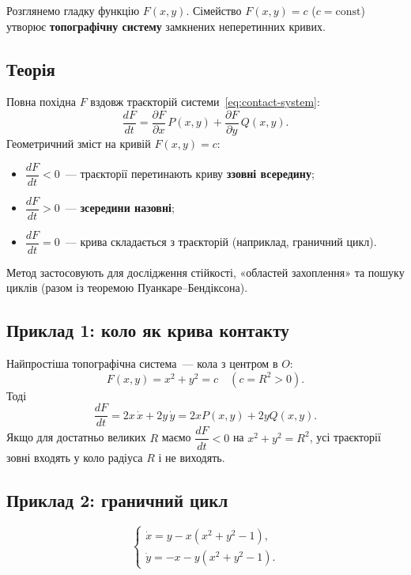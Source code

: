 \documentclass[12pt,a4paper]{article}
\begin{document}
Розглянемо гладку функцію $F(x,y)$. Сімейство $F(x,y)=c$ ($c=\mathrm{const}$)
утворює \textbf{топографічну систему} замкнених неперетинних кривих.

\subsection{Теорія}

Повна похідна $F$ вздовж траєкторій системи~\eqref{eq:contact-system}:
\begin{equation}\label{eq:dFdt}
  \frac{dF}{dt}
  = \frac{\partial F}{\partial x}\,P(x,y)
  + \frac{\partial F}{\partial y}\,Q(x,y).
\end{equation}
Геометричний зміст на кривій $F(x,y)=c$:
\begin{itemize}[leftmargin=1.6em]
  \item $\dfrac{dF}{dt}<0$~--- траєкторії перетинають криву \textbf{ззовні всередину};
  \item $\dfrac{dF}{dt}>0$~--- \textbf{зсередини назовні};
  \item $\dfrac{dF}{dt}=0$~--- крива складається з траєкторій (наприклад,
        граничний цикл).
\end{itemize}
Метод застосовують для дослідження стійкості, «областей захоплення» та
пошуку циклів (разом із теоремою Пуанкаре--Бендіксона).

\subsection{Приклад 1: коло як крива контакту}

Найпростіша топографічна система~--- кола з центром в $O$:
\begin{equation}\label{eq:contact-circle}
  F(x,y)=x^2+y^2=c \quad (c=R^2>0).
\end{equation}
Тоді
\begin{equation}\label{eq:dFdt-circle}
  \frac{dF}{dt}=2x\,\dot{x}+2y\,\dot{y}=2xP(x,y)+2yQ(x,y).
\end{equation}
Якщо для достатньо великих $R$ маємо $\dfrac{dF}{dt}<0$ на $x^2+y^2=R^2$,
усі траєкторії зовні входять у коло радіуса $R$ і не виходять.

\subsection{Приклад 2: граничний цикл}

\begin{equation}\label{eq:contact-limit}
\begin{cases}
  \dot{x} = y - x(x^2+y^2-1),\\
  \dot{y} = -x - y(x^2+y^2-1).
\end{cases}
\end{equation}
\end{document}
